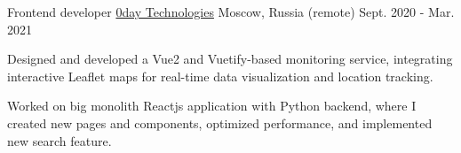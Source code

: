 \begin{cventries}
  \cventry
    {Frontend developer} %
    {\href{https://0day.llc/}{0day Technologies}}
    {Moscow, Russia (remote)} %
    {Sept. 2020 - Mar. 2021} %
    {
      \begin{cvitems} %
        \item {Designed and developed a Vue2 and Vuetify-based monitoring service, integrating interactive Leaflet maps for real-time data visualization and location tracking.}
        \item {Worked on big monolith Reactjs application with Python backend, where I created new pages and components, optimized performance, and implemented new search feature.}
      \end{cvitems}
    }
    {\vspace{16pt}}

\end{cventries}
